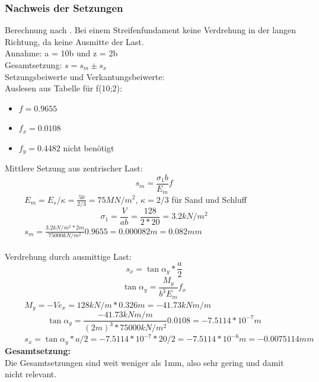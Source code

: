 \documentclass[11pt,fleqn,a4paper,halfparskip]{article}
\begin{document}
\subsubsection{Nachweis der Setzungen}
Berechnung nach \cite[S.68]{wsp}. Bei einem Streifenfundament keine Verdrehung in der langen Richtung, da keine Ausmitte der Last. \\
Annahme: a = 10b und z = 2b\\
Gesamtsetzung: $ s = s_m \pm s_x$ \\
Setzungsbeiwerte und Verkantungsbeiwerte:\\
Auslesen aus Tabelle \cite[s.69]{wsp} für f(10;2):\\
\begin{itemize}
\item $f = 0.9655$
\item $f_x = 0.0108$
\item $f_y = 0.4482$ nicht benötigt
\end{itemize}
Mittlere Setzung aus zentrischer Last:
\begin{equation*}
s_m = \frac{\sigma_1b}{E_m}f
\end{equation*}
$\hspace{1cm} E_m = E_s/\kappa = \frac{50}{2/3} = 75MN/m^2$, $\kappa = 2/3$ für Sand und Schluff
\begin{equation*}
\sigma_1 = \frac{V}{ab} = \frac{128}{2*20} = 3.2kN/m^2
\end{equation*}
$\hspace{1cm} s_m = \frac{3.2kN/m^2*2m}{75000kN/m^2}0.9655 = 0.000082m = 0.082mm $ \\
\\
Verdrehung durch ausmittige Last:\\
\begin{equation*}
s_x = \tan\alpha_y * \frac{a}{2}
\end{equation*}
\begin{equation*}
\tan\alpha_y = \frac{M_y}{b^3E_m}f_x
\end{equation*}
$\hspace{1cm} M_y = -Ve_x = 128kN/m * 0.326m = -41.73kNm/m $
\begin{equation*}
\tan\alpha_y = \frac{-41.73kNm/m}{(2m)^3*75000kN/m^2} 0.0108 = -7.5114*10^{-7}m
\end{equation*}
$\hspace{1cm} s_x = \tan\alpha_y * a/2 = -7.5114*10^{-7} * 20 / 2 = -7.5114*10^{-6}m = -0.0075114mm $
\\
\textbf{Gesamtsetzung:}\\
Die Gesamtsetzungen sind weit weniger als 1mm, also sehr gering und damit nicht relevant.
\end{document}
